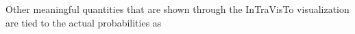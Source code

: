     Other meaningful quantities that are shown through the InTraVisTo visualization are tied to the actual probabilities as


